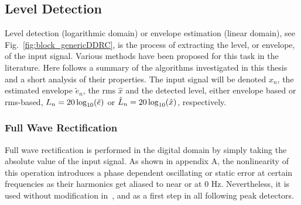 \documentclass[../main2.tex]{subfiles}
\begin{document}
\subsection{Level Detection}\label{level_detection}
Level detection (logarithmic domain) or envelope estimation (linear domain), see Fig.~\ref{fig:block_genericDDRC}, is the process of extracting the level, or envelope, of the input signal. Various methods have been proposed for this task in the literature. Here follows a summary of the algorithms investigated in this thesis and a short analysis of their properties. The input signal will be denoted $x_n$, the estimated envelope $\tilde{e}_n$, the rms $\hat{x}$ and the detected level, either envelope based or rms-based, $L_n = 20\log_{10}(\tilde{e})$ or $\hat{L}_n=20\log_{10}(\hat{x})$, respectively. 

\subsubsection{Full Wave Rectification}
Full wave rectification is performed in the digital domain by simply taking the absolute value of the input signal. As shown in appendix A, the nonlinearity of this operation introduces a phase dependent oscillating or static error at certain frequencies as their harmonics get aliased to near or at 0 Hz. Nevertheless, it is used without modification in~\cite{reiss2012tutorial}, and as a first step in all following peak detectors.
\end{document}
